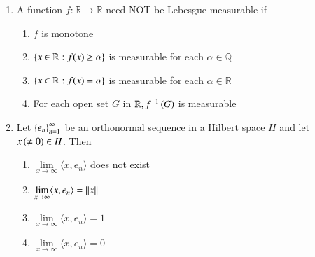 \documentclass[journal]{IEEEtran}
\begin{document}
\begin{enumerate}
\item A function $f:\mathbb R \rightarrow \mathbb R$ need NOT be Lebesgue measurable if
\begin{enumerate}
    \item $f$ is monotone
    \item $\left\{x \in \mathbb R:f(x) \geq \alpha\right\}$ is measurable for each $\alpha \in \mathbb Q$
    \item $\left\{x \in \mathbb R:f(x) = \alpha\right\}$ is measurable for each $\alpha \in \mathbb R$
    \item For each open set $G$ in $\mathbb R, f^{-1}\left(G\right)$ is measurable
\end{enumerate}

\item Let $\left\{e_n\right\}_{n=1}^\infty$ be an orthonormal sequence in a Hilbert space $H$ and let $x\left(\neq 0\right) \in H$. Then 
\begin{enumerate}
    \item $\lim\limits_{x\to \infty} \langle x, e_n \rangle $ does not exist
    \item $\lim\limits_{x\to \infty} \langle x, e_n \rangle =\left\vert\left\vert x\right\vert\right\vert$
    \item $\lim\limits_{x\to \infty} \langle x, e_n \rangle =1$
    \item $\lim\limits_{x\to \infty} \langle x, e_n \rangle =0$
\end{enumerate}
\end{enumerate}
\end{document}
